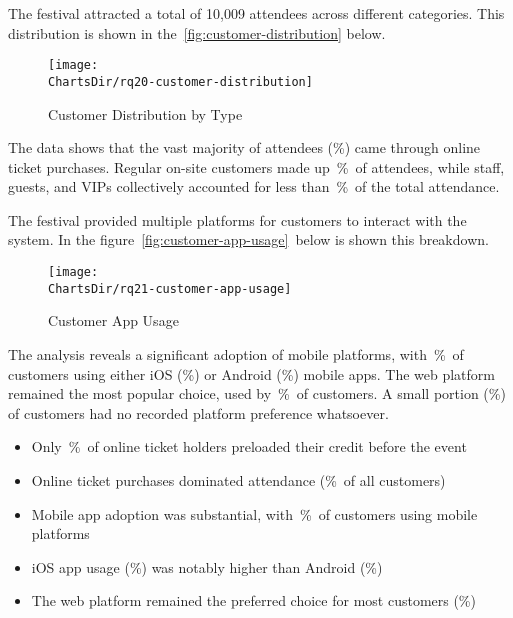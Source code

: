 
The festival attracted a total of 10,009 attendees across different categories.
This distribution is shown in the~\autoref{fig:customer-distribution} below.

\begin{figure}[H]
	\centering
	\texttt{[image: \\ChartsDir/rq20-customer-distribution]}
	\caption{ Customer Distribution by Type}
	\label{fig:customer-distribution}
	\source
\end{figure}

The data shows that the vast majority of attendees (\%) came through online ticket purchases.
Regular on-site customers made up~\%~of attendees, while staff, guests, and VIPs collectively accounted for less than~\%~of the total attendance.


The festival provided multiple platforms for customers to interact with the system.
In the figure~\autoref{fig:customer-app-usage}~below is shown this breakdown.

\begin{figure}[H]
	\centering
	\texttt{[image: \\ChartsDir/rq21-customer-app-usage]}
	\caption{ Customer App Usage}
	\label{fig:customer-app-usage}
	\source
\end{figure}

The analysis reveals a significant adoption of mobile platforms, with~\%~of customers using either iOS (\%) or Android (\%) mobile apps.
The web platform remained the most popular choice, used by~\%~of customers.
A small portion (\%) of customers had no recorded platform preference whatsoever.

\begin{keytakeaways}
	\begin{itemize}
		\item Only~\%~of online ticket holders preloaded their credit before the event
		\item Online ticket purchases dominated attendance (\%~of all customers)
		\item Mobile app adoption was substantial, with~\%~of customers using mobile platforms
		\item iOS app usage (\%) was notably higher than Android (\%)
		\item The web platform remained the preferred choice for most customers (\%)
	\end{itemize}
\end{keytakeaways}


